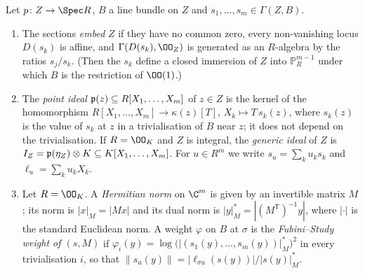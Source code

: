 \begin{definition}\label{pf:covol:def:emb}
Let $p\colon Z\to\Spec R$, $B$ a line bundle on $Z$ and $s_1,\dots,s_m\in\Gamma(Z,B)$.
\begin{enumerate}[label=(\alph*)]
\item The sections \emph{embed} $Z$ if they have no common zero, every non-vanishing locus $D(s_k)$ is
  affine, and $\Gamma(D(s_k),\OO_Z)$ is generated as an $R$-algebra by the ratios $s_j/s_k$. (Then the
  $s_k$ define a closed immersion of $Z$ into $\mathbb P^{m-1}_R$ under which $B$ is the restriction of
  $\OO(1)$.)
\item The \emph{point ideal} $\mathfrak{p}(z)\subseteq R[X_1,\dots,X_m]$ of $z\in Z$ is the kernel of the
  homomorphism $R[X_1,\dots,X_m]\to\kappa(z)[T]$, $X_k\mapsto T\,s_k(z)$, where $s_k(z)$ is the value of
  $s_k$ at $z$ in a trivialisation of $B$ near $z$; it does not depend on the trivialisation. If
  $R=\OO_K$ and $Z$ is integral, the \emph{generic ideal} of $Z$ is $I_Z=\mathfrak{p}(\eta_Z)\otimes K
  \subseteq K[X_1,\dots,X_m]$. For $u\in R^m$ we write $s_u=\sum_ku_ks_k$ and
  $\ell_u=\sum_ku_kX_k$.
\item Let $R=\OO_K$. A \emph{Hermitian norm} on $\C^m$ is given by an invertible matrix $M$; its norm
  is $|x|_M=|Mx|$ and its dual norm is $|y|^*_M=|(M^{\mathsf T})^{-1}y|$, where $|\cdot|$ is the
  standard Euclidean norm. A weight $\varphi$ on $B$ at $\sigma$ is the \emph{Fubini--Study weight of
  $(s,M)$} if $\varphi_i(y)=\log\bigl(|(s_1(y),\dots,s_m(y))|^*_M\bigr)^2$ in every trivialisation $i$,
  so that $\|s_u(y)\|=|\ell_{\sigma u}(s(y))|/|s(y)|^*_M$.
\end{enumerate}
%
\end{definition}


